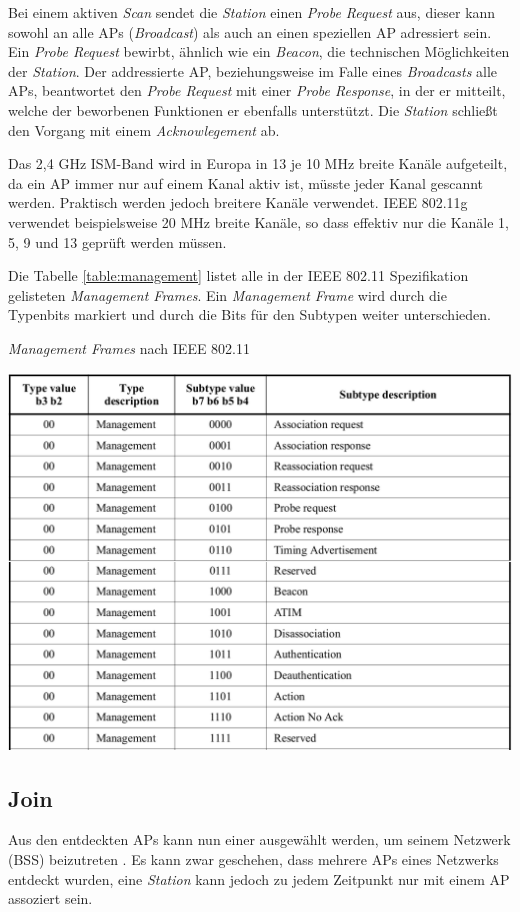 Bei einem aktiven \emph{Scan} sendet die \emph{Station} einen \emph{Probe Request} aus, dieser kann sowohl an alle APs (\emph{Broadcast}) als auch an einen speziellen AP adressiert sein.
Ein \emph{Probe Request} bewirbt, ähnlich wie ein \emph{Beacon}, die technischen Möglichkeiten der \emph{Station}.
Der addressierte AP, beziehungsweise im Falle eines \emph{Broadcasts} alle APs, beantwortet den \emph{Probe Request} mit einer \emph{Probe Response}, in der er mitteilt, welche der beworbenen Funktionen er ebenfalls unterstützt.
Die \emph{Station} schließt den Vorgang mit einem \emph{Acknowlegement} ab.

Das 2,4 GHz ISM-Band wird in Europa in 13 je 10 MHz breite Kanäle aufgeteilt, da ein AP immer nur auf einem Kanal aktiv ist, müsste jeder Kanal gescannt werden.
Praktisch werden jedoch breitere Kanäle verwendet.
IEEE 802.11g verwendet beispielsweise 20 MHz breite Kanäle, so dass effektiv nur die Kanäle 1, 5, 9 und 13 geprüft werden müssen.

Die Tabelle \ref{table:management} listet alle in der IEEE 802.11 Spezifikation gelisteten \emph{Management Frames}.
Ein \emph{Management Frame} wird durch die Typenbits markiert und durch die Bits für den Subtypen weiter unterschieden.

\begin{table}[h]
	\centering
	\caption{\emph{Management Frames} nach IEEE 802.11 \cite{ieee2012management}}
	\label{table:management}
\includegraphics[width=\textwidth]{images/managementframes.png}
\end{table}

\subsection{Join}
Aus den entdeckten APs kann nun einer ausgewählt werden, um seinem Netzwerk (BSS) beizutreten \cite{ieee2012join}.
Es kann zwar geschehen, dass mehrere APs eines Netzwerks entdeckt wurden, eine \emph{Station} kann jedoch zu jedem Zeitpunkt nur mit einem AP assoziert sein.

